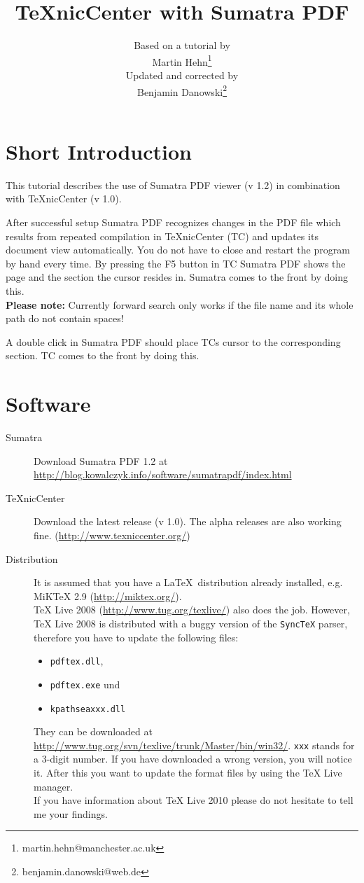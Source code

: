 \documentclass[parskip=half-]{scrartcl}
\title{TeXnicCenter with Sumatra PDF}
\author{Based on a tutorial by\\
Martin Hehn\thanks{martin.hehn@manchester.ac.uk}\\
Updated and corrected by\\
Benjamin Danowski\thanks{benjamin.danowski@web.de}}
\begin{document}
\maketitle
\tableofcontents
\section{Short Introduction}
This tutorial describes the use of Sumatra PDF viewer (v 1.2) in combination with TeXnicCenter (v 1.0).

After successful setup Sumatra PDF recognizes changes in the PDF file which results from repeated compilation in TeXnicCenter (TC) and updates its document view automatically. You do not have to close and restart the program by hand every time. By pressing the F5 button in TC Sumatra PDF shows the page and the section the cursor resides in. Sumatra comes to the front by doing this.\\
\textbf{Please note:} Currently forward search only works if the file name and its whole path do not contain spaces!

A double click in Sumatra PDF should place TCs cursor to the corresponding section. TC comes to the front by doing this.

\section{Software}

\begin{description}
	\item[Sumatra] Download Sumatra PDF 1.2 at \url{http://blog.kowalczyk.info/software/sumatrapdf/index.html} 
	\item[TeXnicCenter] Download the latest release (v 1.0). The alpha releases are also working fine. (\url{http://www.texniccenter.org/})
	\item[Distribution] It is assumed that you have a \LaTeX\ distribution already installed, e.g. MiKTeX 2.9 (\url{http://miktex.org/}).\\
TeX Live 2008 (\url{http://www.tug.org/texlive/}) also does the job. However, TeX Live 2008 is distributed with a buggy version of the \texttt{SyncTeX} parser, therefore you have to update the following files:
\begin{itemize}
	\item \texttt{pdftex.dll},
	\item \texttt{pdftex.exe} und
	\item \texttt{kpathseaxxx.dll}
\end{itemize}
They can be downloaded at \url{http://www.tug.org/svn/texlive/trunk/Master/bin/win32/}. \texttt{xxx} stands for a 3-digit number. If you have downloaded a wrong version, you will notice it. After this you want to update the format files by using the TeX Live manager.\\
If you have information about TeX Live 2010 please do not hesitate to tell me your findings.
\end{description}
\end{document}
